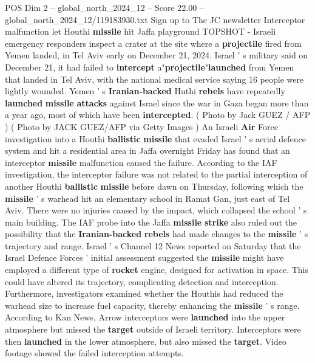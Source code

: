 \begin{textsample}{POS Dim 2 – global\_north\_2024\_12 – Score 22.00 – global\_north\_2024\_12/119183930.txt}  \label{ex:f2_pos_272}
Sign up to The JC newsletter Interceptor malfunction let Houthi \textbf{missile} hit Jaffa playground TOPSHOT - Israeli emergency responders inspect a crater at the site where a \textbf{projectile} fired from Yemen landed, in Tel Aviv early on December 21, 2024.
Israel ' s military said on December 21, it had failed to \textbf{intercept} a"\textbf{projectile}"\textbf{launched} from Yemen that landed in Tel Aviv, with the national medical service saying 16 people were lightly wounded.
Yemen ' s \textbf{Iranian-backed} Huthi \textbf{rebels} have repeatedly \textbf{launched} \textbf{missile} \textbf{attacks} against Israel since the war in Gaza began more than a year ago, most of which have been \textbf{intercepted}. ( Photo by Jack GUEZ / AFP ) ( Photo by JACK GUEZ/AFP via Getty Images ) An Israeli \textbf{Air} Force investigation into a Houthi \textbf{ballistic} \textbf{missile} that evaded Israel ' s aerial defence system and hit a residential area in Jaffa overnight Friday has found that an interceptor \textbf{missile} malfunction caused the failure.
According to the IAF investigation, the interceptor failure was not related to the partial interception of another Houthi \textbf{ballistic} \textbf{missile} before dawn on Thursday, following which the \textbf{missile} ' s warhead hit an elementary school in Ramat Gan, just east of Tel Aviv.
There were no injuries caused by the impact, which collapsed the school ' s main building.
The IAF probe into the Jaffa \textbf{missile} \textbf{strike} also ruled out the possibility that the \textbf{Iranian-backed} \textbf{rebels} had made changes to the \textbf{missile} ' s trajectory and range.
Israel ' s Channel 12 News reported on Saturday that the Israel Defence Forces ' initial assessment suggested the \textbf{missile} might have employed a different type of \textbf{rocket} engine, designed for activation in space.
This could have altered its trajectory, complicating detection and interception.
Furthermore, investigators examined whether the Houthis had reduced the warhead size to increase fuel capacity, thereby enhancing the \textbf{missile} ' s range.
According to Kan News, Arrow interceptors were \textbf{launched} into the upper atmosphere but missed the \textbf{target} outside of Israeli territory.
Interceptors were then \textbf{launched} in the lower atmosphere, but also missed the \textbf{target}.
Video footage showed the failed interception attempts.

\end{textsample}
